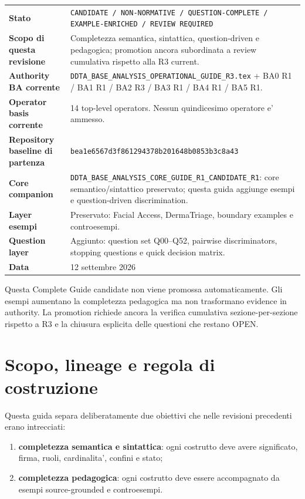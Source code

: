 \documentclass[11pt,a4paper]{article}
\begin{document}
\begin{titlepage}
\vspace{8mm}
\begin{tabularx}{\textwidth}{L{47mm}Y}
\toprule
\textbf{Stato} & \texttt{CANDIDATE / NON-NORMATIVE / QUESTION-COMPLETE / EXAMPLE-ENRICHED / REVIEW REQUIRED} \\
\textbf{Scopo di questa revisione} & Completezza semantica, sintattica, question-driven e pedagogica; promotion ancora subordinata a review cumulativa rispetto alla R3 current. \\
\textbf{Authority BA corrente} & \texttt{DDTA\_BASE\_ANALYSIS\_OPERATIONAL\_GUIDE\_R3.tex} + BA0 R1 / BA1 R1 / BA2 R3 / BA3 R1 / BA4 R1 / BA5 R1. \\
\textbf{Operator basis corrente} & 14 top-level operators. Nessun quindicesimo operatore e' ammesso. \\
\textbf{Repository baseline di partenza} & \texttt{bea1e6567d3f861294378b201648b0853b3c8a43} \\
\textbf{Core companion} & {\scriptsize\nolinkurl{DDTA_BASE_ANALYSIS_CORE_GUIDE_R1_CANDIDATE_R1}}: core semantico/sintattico preservato; questa guida aggiunge esempi e question-driven discrimination. \\
\textbf{Layer esempi} & Preservato: Facial Access, DermaTriage, boundary examples e controesempi. \\
\textbf{Question layer} & Aggiunto: question set Q00--Q52, pairwise discriminators, stopping questions e quick decision matrix. \\
\textbf{Data} & 12 settembre 2026 \\
\bottomrule
\end{tabularx}

\vfill
\begin{ddtaopen}[title={Promotion stop esplicito}]
Questa Complete Guide candidate non viene promossa automaticamente. Gli esempi aumentano la completezza pedagogica ma non trasformano evidence in authority. La promotion richiede ancora la verifica cumulativa sezione-per-sezione rispetto a R3 e la chiusura esplicita delle questioni che restano OPEN.
\end{ddtaopen}
\end{titlepage}

\tableofcontents
\clearpage

\section{Scopo, lineage e regola di costruzione}

Questa guida separa deliberatamente due obiettivi che nelle revisioni precedenti erano intrecciati:
\begin{enumerate}
  \item \textbf{completezza semantica e sintattica}: ogni costrutto deve avere significato, firma, ruoli, cardinalita', confini e stato;
  \item \textbf{completezza pedagogica}: ogni costrutto deve essere accompagnato da esempi source-grounded e controesempi.
\end{enumerate}
\end{document}
